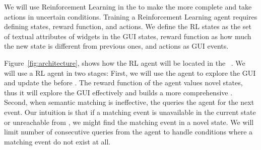 \bigskip
We will use Reinforcement Learning in the \testreuse to make the \tam more complete and take actions in uncertain conditions.
Training a Reinforcement Learning agent requires defining  states, reward function, and actions.
We define the RL states as the set of textual attributes of widgets in the GUI states, reward function as how much the new state is different from previous ones, and actions as GUI events.

\bigskip
Figure~\ref{fig:architecture}, shows how the RL agent will be located in the \testreuse~\architecture.
We will use a RL agent in two stages: 
First, we will use the agent to explore the GUI and update the \tam before \testreuse.
The reward function of the agent values novel states, thus it will explore the GUI effectively and builds a more comprehensive \tam.
Second, when semantic matching is ineffective, the \selector queries the agent for the next event.
Our intuition is that if a matching event is unavailable in the current state or unreachable from \tam, we might find the matching event in a novel state.
We will limit number of consecutive queries from the agent to handle conditions where a matching event do not exist at all.


